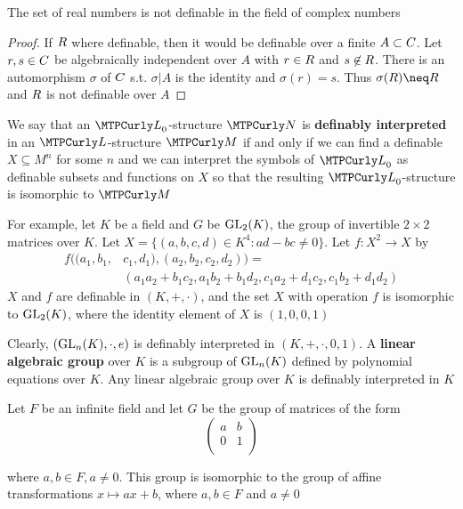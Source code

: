 \documentclass[11pt]{article}
\begin{document}
\begin{corollary}[]
The set of real numbers is not definable in the field of complex numbers
\end{corollary}

\begin{proof}
If \(\relax{R}\) where definable, then it would be definable over a finite
\(A\subset\relax{C}\). Let \(r,s\in\relax{C}\) be algebraically independent over \(A\) with
\(r\in\relax{R}\) and \(s\not\in\relax{R}\). There is an automorphism \(\sigma\) of \(\relax{C}\) s.t.
\(\sigma|A\) is the identity and \(\sigma(r)=s\). Thus \(\sigma(\R)\neq\R\) and
\(\relax{R}\) is not definable over \(A\)
\end{proof}

We say that an \(\call_0\)-structure \(\caln\) is \textbf{definably interpreted} in
an \(\call\)-structure \(\calm\) if and only if we can find a definable
\(X\subseteq M^n\) for some \(n\) and we can interpret the symbols of \(\call_0\)
as definable subsets and functions on \(X\) so that the resulting
\(\call_0\)-structure is isomorphic to \(\calm\)


For example, let \(K\) be a field and \(G\) be \(\text{GL}_2(K)\), the group of
invertible \(2\times 2\) matrices over \(K\). Let \(X=\{(a,b,c,d)\in K^4:ad-bc\neq
   0\}\). Let \(f:X^2\to X\) by
\begin{align*}
f((a_1,b_1,&c_1,d_1),(a_2,b_2,c_2,d_2))=\\
&(a_1a_2+b_1c_2,a_1b_2+b_1d_2,c_1a_2+d_1c_2,c_1b_2+d_1d_2)
\end{align*}
\(X\) and \(f\) are definable in \((K,+,\cdot)\), and the set \(X\) with operation
\(f\) is isomorphic to \(\text{GL}_2(K)\), where the identity element of \(X\) is
\((1,0,0,1)\) 

Clearly, \((\text{GL}_n(K),\cdot,e)\) is definably interpreted in \((K,+,\cdot,0,1)\).
A \textbf{linear algebraic group} over \(K\) is a subgroup of \(\text{GL}_n(K)\) defined by
polynomial equations over \(K\). Any linear algebraic group over \(K\) is
definably interpreted in \(K\)

Let \(F\) be an infinite field and let \(G\) be the group of matrices of the form 
\[
\begin{pmatrix}
 a & b \\
 0 & 1 \\
\end{pmatrix}
\]

where \(a,b\in F, a\neq 0\). This group is isomorphic to the group of affine
transformations \(x\mapsto ax+b\), where \(a,b\in F\) and \(a\neq 0\)
\end{document}
